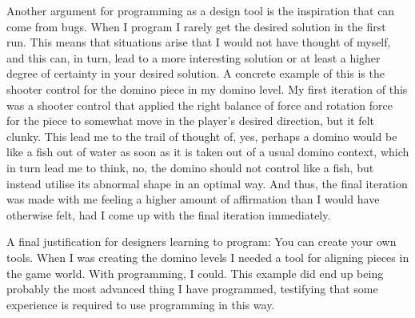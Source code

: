 Another argument for programming as a design tool is the inspiration that can come from bugs. When I program I rarely get the desired solution in the first run. This means that situations arise that I would not have thought of myself, and this can, in turn, lead to a more interesting solution or at least a higher degree of certainty in your desired solution. A concrete example of this is the shooter control for the domino piece in my domino level. My first iteration of this was a shooter control that applied the right balance of force and rotation force for the piece to somewhat move in the player's desired direction, but it felt clunky. This lead me to the trail of thought of, yes, perhaps a domino would be like a fish out of water as soon as it is taken out of a usual domino context, which in turn lead me to think, no, the domino should not control like a fish, but instead utilise its abnormal shape in an optimal way. And thus, the final iteration was made with me feeling a higher amount of affirmation than I would have otherwise felt, had I come up with the final iteration immediately.

A final justification for designers learning to program: You can create your own tools. When I was creating the domino levels I needed a tool for aligning pieces in the game world. With programming, I could. This example did end up being probably the most advanced thing I have programmed, testifying that some experience is required to use programming in this way.
